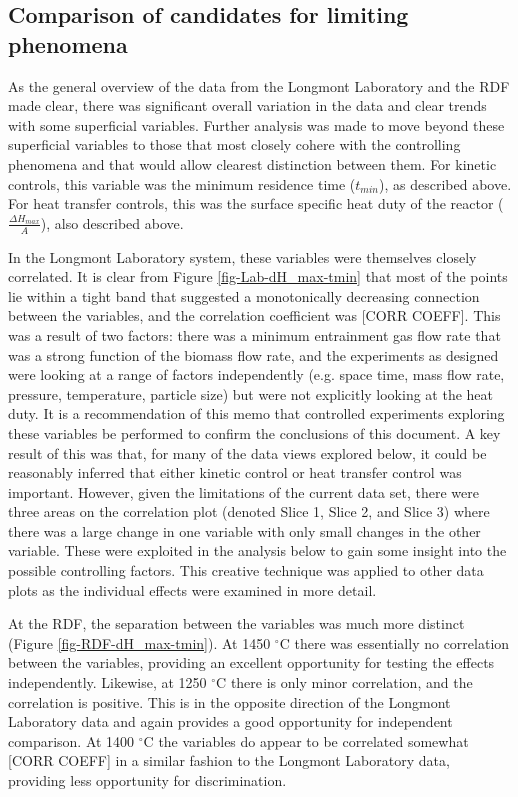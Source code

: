 \documentclass[11pt,twocolumn]{article}
\begin{document}
\subsection*{Comparison of candidates for limiting phenomena}

As the general overview of the data from the Longmont Laboratory and the RDF made clear, there was significant overall variation in the data and clear trends with some superficial variables.  Further analysis was made to move beyond these superficial variables to those that most closely cohere with the controlling phenomena and that would allow clearest distinction between them.  For kinetic controls, this variable was the minimum residence time ($t_{min}$), as described above.  For heat transfer controls, this was the surface specific heat duty of the reactor ($\frac{\Delta H_{max}}{A}$), also described above.  

In the Longmont Laboratory system, these variables were themselves closely correlated. It is clear from Figure \ref{fig-Lab-dH_max-tmin} that most of the points lie within a tight band that suggested a monotonically decreasing connection between the variables, and the correlation coefficient was [CORR COEFF].  This was a result of two factors: there was a minimum entrainment gas flow rate that was a strong function of the biomass flow rate, and the experiments as designed were looking at a range of factors independently (e.g. space time, mass flow rate, pressure, temperature, particle size) but were not explicitly looking at the heat duty.  It is a recommendation of this memo that controlled experiments exploring these variables be performed to confirm the conclusions of this document.  A key result of this was that, for many of the data views explored below, it could be reasonably inferred that either kinetic control or heat transfer control was important.  However, given the limitations of the current data set, there were three areas on the correlation plot (denoted Slice 1, Slice 2, and Slice 3) where there was a large change in one variable with only small changes in the other variable.  These were exploited in the analysis below to gain some insight into the possible controlling factors.  This creative technique was applied to other data plots as the individual effects were examined in more detail.

At the RDF, the separation between the variables was much more distinct (Figure \ref{fig-RDF-dH_max-tmin}).  At 1450 $^{\circ}$C there was essentially no correlation between the variables, providing an excellent opportunity for testing the effects independently.  Likewise, at 1250 $^{\circ}$C there is only minor correlation, and the correlation is positive.  This is in the opposite direction of the Longmont Laboratory data and again provides a good opportunity for independent comparison.  At 1400 $^{\circ}$C the variables do appear to be correlated somewhat [CORR COEFF] in a similar fashion to the Longmont Laboratory data, providing less opportunity for discrimination.
\end{document}

